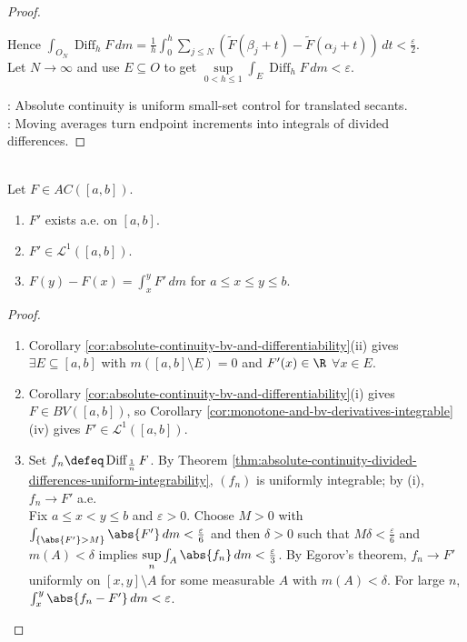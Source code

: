 \begin{theorem}
\begin{proof}
\begin{enumerate}[label=(\roman*)]
Hence $\int_{O_N}\operatorname{Diff}_hF\,dm=\frac{1}{h}\int_0^h\sum\limits_{j\leq N}(\widetilde F(\beta_j+t)-\widetilde F(\alpha_j+t))\,dt<\frac{\varepsilon}{2}$.\\
Let $N\to\infty$ and use $E\subseteq O$ to get $\sup\limits_{0<h\leq1}\int_E\operatorname{Diff}_hF\,dm<\varepsilon$.
\end{enumerate}
: Absolute continuity is uniform small-set control for translated secants.\\
: Moving averages turn endpoint increments into integrals of divided differences.
\end{proof}
\end{theorem}

\begin{theorem} \label{thm:fundamental-theorem-absolutely-continuous-lebesgue} \\
Let $F\in AC([a,b])$.
\begin{enumerate}[label=(\roman*)]
\setlength{\itemsep}{0pt}
\item $F'$ exists a.e. on $[a,b]$.
\item $F'\in\mathscr{L}^1([a,b])$.
\item $F(y)-F(x)=\int_x^yF'\,dm$ for $a\leq x\leq y\leq b$.
\end{enumerate}
\begin{proof}
\begin{enumerate}[label=(\roman*)]
\setlength{\itemsep}{0pt}
\item Corollary \ref{cor:absolute-continuity-bv-and-differentiability}(ii) gives $\exists E\subseteq[a,b]$ with $m([a,b]\setminus E)=0$ and $F'(x)\in\R$ $\forall x\in E$.
\item Corollary \ref{cor:absolute-continuity-bv-and-differentiability}(i) gives $F\in BV([a,b])$, so Corollary \ref{cor:monotone-and-bv-derivatives-integrable}(iv) gives $F'\in\mathscr{L}^1([a,b])$.
\item Set $f_n\defeq\operatorname{Diff}_{\frac{1}{n}}F$. By Theorem \ref{thm:absolute-continuity-divided-differences-uniform-integrability}, $(f_n)$ is uniformly integrable; by (i), $f_n\to F'$ a.e.\\
Fix $a\leq x<y\leq b$ and $\varepsilon>0$. Choose $M>0$ with $\int_{\{\abs{F'}>M\}}\abs{F'}\,dm<\frac{\varepsilon}{6}$ and then $\delta>0$ such that $M\delta<\frac{\varepsilon}{6}$ and $m(A)<\delta$ implies $\sup\limits_n\int_A\abs{f_n}\,dm<\frac{\varepsilon}{3}$. By Egorov's theorem, $f_n\to F'$ uniformly on $[x,y]\setminus A$ for some measurable $A$ with $m(A)<\delta$. For large $n$, $\int_x^y\abs{f_n-F'}\,dm<\varepsilon$.\\

\end{enumerate}
\end{proof}
\end{theorem}
